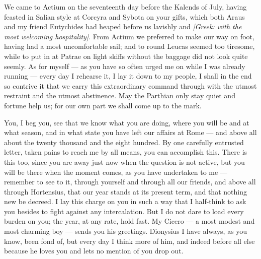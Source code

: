 

 We came to Actium on the seventeenth day before the Kalends of July, having feasted in Salian style at Corcyra and Sybota on your gifts, which both Araus and my friend Eutychides had heaped before us lavishly and \textit{[Greek: with the most welcoming hospitality]}. From Actium we preferred to make our way on foot, having had a most uncomfortable sail; and to round Leucas seemed too tiresome, while to put in at Patrae on light skiffs without the baggage did not look quite seemly. As for myself --- as you have so often urged me on while I was already running --- every day I rehearse it, I lay it down to my people, I shall in the end so contrive it that we carry this extraordinary command through with the utmost restraint and the utmost abstinence. May the Parthian only stay quiet and fortune help us; for our own part we shall come up to the mark.

 You, I beg you, see that we know what you are doing, where you will be and at what season, and in what state you have left our affairs at Rome --- and above all about the twenty thousand and the eight hundred. By one carefully entrusted letter, taken pains to reach me by all means, you can accomplish this. There is this too, since you are away just now when the question is not active, but you will be there when the moment comes, as you have undertaken to me --- remember to see to it, through yourself and through all our friends, and above all through Hortensius, that our year stands at its present term, and that nothing new be decreed. I lay this charge on you in such a way that I half-think to ask you besides to fight against any intercalation. But I do not dare to load every burden on you; the year, at any rate, hold fast. My Cicero --- a most modest and most charming boy --- sends you his greetings. Dionysius I have always, as you know, been fond of, but every day I think more of him, and indeed before all else because he loves you and lets no mention of you drop out.
